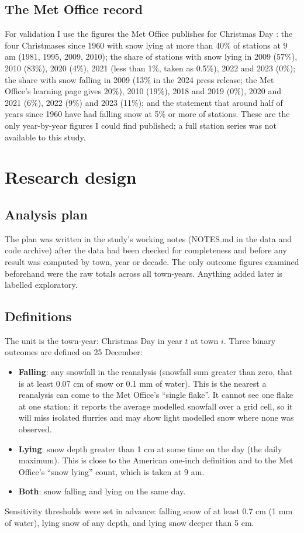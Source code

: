 \documentclass[11pt,a4paper]{article}
\begin{document}
\subsection{The Met Office record}
For validation I use the figures the Met Office publishes for Christmas Day \citep{metoffice2024,metoffice2025}: the four Christmases since 1960 with snow lying at more than 40\% of stations at 9 am (1981, 1995, 2009, 2010); the share of stations with snow lying in 2009 (57\%), 2010 (83\%), 2020 (4\%), 2021 (less than 1\%, taken as 0.5\%), 2022 and 2023 (0\%); the share with snow falling in 2009 (13\% in the 2024 press release; the Met Office's learning page gives 20\%), 2010 (19\%), 2018 and 2019 (0\%), 2020 and 2021 (6\%), 2022 (9\%) and 2023 (11\%); and the statement that around half of years since 1960 have had falling snow at 5\% or more of stations. These are the only year-by-year figures I could find published; a full station series was not available to this study.

\section{Research design}\label{sec:design}
\subsection{Analysis plan}
The plan was written in the study's working notes (NOTES.md in the data and code archive) after the data had been checked for completeness and before any result was computed by town, year or decade. The only outcome figures examined beforehand were the raw totals across all town-years. Anything added later is labelled exploratory.

\subsection{Definitions}
The unit is the town-year: Christmas Day in year $t$ at town $i$. Three binary outcomes are defined on 25 December:
\begin{itemize}
\item \textbf{Falling}: any snowfall in the reanalysis (snowfall sum greater than zero, that is at least 0.07 cm of snow or 0.1 mm of water). This is the nearest a reanalysis can come to the Met Office's ``single flake''. It cannot see one flake at one station: it reports the average modelled snowfall over a grid cell, so it will miss isolated flurries and may show light modelled snow where none was observed.
\item \textbf{Lying}: snow depth greater than 1 cm at some time on the day (the daily maximum). This is close to the American one-inch definition and to the Met Office's ``snow lying'' count, which is taken at 9 am.
\item \textbf{Both}: snow falling and lying on the same day.
\end{itemize}
Sensitivity thresholds were set in advance: falling snow of at least 0.7 cm (1 mm of water), lying snow of any depth, and lying snow deeper than 5 cm.
\end{document}
